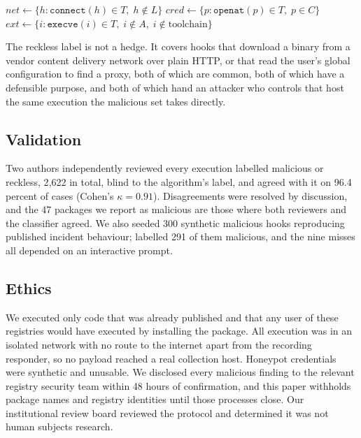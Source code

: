 \begin{algorithm}[t]
  \caption{Behavioural classification of one hook execution}
  \label{alg:classify}
  \SetAlgoLined
  $\mathit{net} \gets \{h : \texttt{connect}(h) \in T,\; h \notin L\}$\;
  $\mathit{cred} \gets \{p : \texttt{openat}(p) \in T,\; p \in C\}$\;
  $\mathit{ext} \gets \{i : \texttt{execve}(i) \in T,\; i \notin A,\;
    i \notin \text{toolchain}\}$\;
\end{algorithm}

The reckless label is not a hedge. It covers hooks that download a binary from
a vendor content delivery network over plain HTTP, or that read the user's
global configuration to find a proxy, both of which are common, both of which
have a defensible purpose, and both of which hand an attacker who controls that
host the same execution the malicious set takes directly.

\subsection{Validation}

Two authors independently reviewed every execution labelled malicious or
reckless, 2{,}622 in total, blind to the algorithm's label, and agreed with it
on 96.4 percent of cases (Cohen's $\kappa = 0.91$). Disagreements were resolved
by discussion, and the 47 packages we report as malicious are those where both
reviewers and the classifier agreed. We also seeded 300 synthetic malicious
hooks reproducing published incident behaviour; \tool{} labelled 291 of them
malicious, and the nine misses all depended on an interactive prompt.

\subsection{Ethics}

We executed only code that was already published and that any user of these
registries would have executed by installing the package. All execution was in
an isolated network with no route to the internet apart from the recording
responder, so no payload reached a real collection host. Honeypot credentials
were synthetic and unusable. We disclosed every malicious finding to the
relevant registry security team within 48 hours of confirmation, and this paper
withholds package names and registry identities until those processes close.
Our institutional review board reviewed the protocol and determined it was not
human subjects research.

